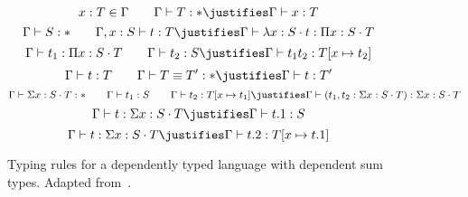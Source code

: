 \begin{figure}
    \begin{proofrules}
        \[ x : T \in \context{\Gamma} \qquad \Gamma \vdash T : *
        \justifies
        \context{\Gamma} \vdash x : T 
        \]
        \[ \Gamma \vdash S : * \qquad \Gamma, x : S \vdash t : T 
        \justifies 
        \Gamma \vdash \lambda x : S \cdot t : \Pi x : S \cdot T 
        \]
        \[ \Gamma \vdash t_1 : \Pi x : S \cdot T \qquad \Gamma \vdash t_2 : S 
        \justifies 
        \Gamma \vdash t_1 t_2 : T[x \mapsto t_2] 
        \]
        \[ \Gamma \vdash t : T \qquad \Gamma \vdash T \equiv T^\prime : * 
        \justifies 
        \Gamma \vdash t : T^\prime 
        \]
        \[ \Gamma \vdash \Sigma x : S \cdot T : * \qquad 
            \Gamma \vdash t_1 : S \qquad  \Gamma \vdash t_2 : T[x \mapsto t_1] 
        \justifies 
        \Gamma \vdash (t_1, t_2 : \Sigma x : S \cdot T) : \Sigma x : S \cdot T 
        \] 
        \[ \Gamma \vdash t : \Sigma x : S \cdot T 
        \justifies 
        \Gamma \vdash t.1 : S 
        \]
        \[ \Gamma \vdash t : \Sigma x : S \cdot T 
        \justifies 
        \Gamma \vdash t.2 : T[x \mapsto t.1] 
        \]
    \end{proofrules}
\caption{Typing rules for a dependently typed language with dependent sum types. Adapted from~\cite{pierce2005advanced}.}
\label{fig:dtt-w-sigma}
\end{figure}